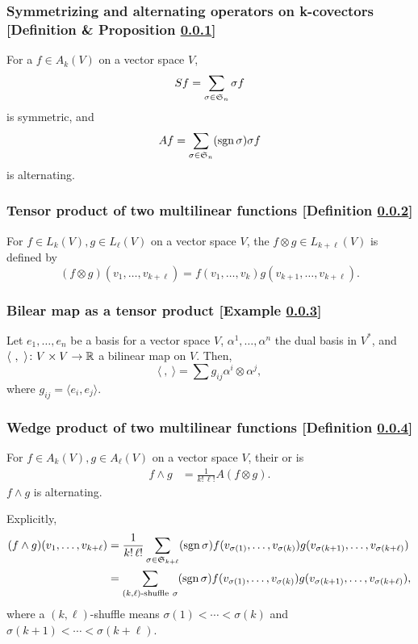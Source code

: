 \subsubsection{Symmetrizing and alternating operators on k-covectors [Definition \& Proposition \ref{symmetrizing-and-alternating-operators-on-k-covectors}]}\label{symmetrizing-and-alternating-operators-on-k-covectors}
For a $f \in A_k(V)$ on a vector space $V$,
\[
Sf = \sum_{\sigma \in \mathfrak{S}_n} \sigma f
\]
is symmetric, and
\[
Af = \sum_{\sigma \in \mathfrak{S}_n} (\mathrm{sgn}\, \sigma) \sigma f
\]
is alternating.

\subsubsection{Tensor product of two multilinear functions [Definition \ref{tensor-product-of-two-multilinear-functions}]}\label{tensor-product-of-two-multilinear-functions}
For $f \in L_k(V), g \in L_\ell(V)$ on a vector space $V$, the  $f \otimes g \in L_{k+\ell}(V)$ is defined by
\[
(f \otimes g) (v_1, \dotsc, v_{k+\ell}) = f(v_1,\dotsc,v_k)g(v_{k+1},\dotsc,v_{k+\ell}).
\]

\subsubsection{Bilear map as a tensor product [Example \ref{bilinear-map-as-a-tensor-product}]}\label{bilinear-map-as-a-tensor-product}
Let $e_1,\dotsc,e_n$ be a basis for a vector space $V$, $\alpha^1,\dotsc,\alpha^n$ the dual basis in $V^*$, and $\langle\ ,\ \rangle \colon V \times V \to \mathbb{R}$ a bilinear map on $V$. Then,
\[
\langle\ , \ \rangle = \sum g_{ij} \alpha^i \otimes \alpha^j,
\]
where $g_{ij} = \langle e_i, e_j \rangle$.

\subsubsection{Wedge product of two multilinear functions [Definition \ref{wedge-product-of-two-multilinear-functions}]}\label{wedge-product-of-two-multilinear-functions}
For $f \in A_k(V), g \in A_\ell(V)$ on a vector space $V$, their  or  is
\begin{align*}
f \wedge g &= \frac1{k!\, \ell!} A( f \otimes g).
\end{align*}
$f \wedge g$ is alternating.

Explicitly,
\begin{align*}
(f \wedge g) (v_1,\dotsc,v_{k+\ell}) &= \frac1{k!\,\ell!} \sum_{\sigma \in \mathfrak{S}_{k+\ell}} (\mathrm{sgn}\, \sigma)f(v_{\sigma(1)},\dotsc,v_{\sigma(k)}) g(v_{\sigma(k+1)},\dotsc,v_{\sigma(k+\ell)}) \\
&= \sum_{(k,\ell)\text{-shuffle}\ \sigma} (\mathrm{sgn}\, \sigma) f(v_{\sigma(1)},\dotsc,v_{\sigma(k)}) g(v_{\sigma(k+1)},\dotsc,v_{\sigma(k+\ell)}),
\end{align*}
where a $(k,\ell)$-shuffle means $\sigma(1)<\dotsb<\sigma(k)$ and $\sigma(k+1)<\dotsb < \sigma(k+\ell)$.

